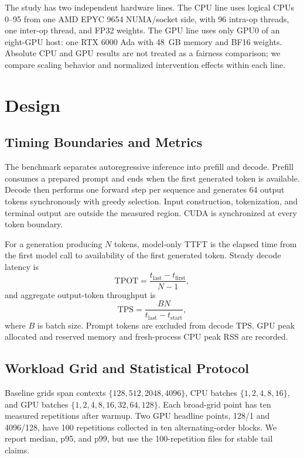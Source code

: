 \documentclass[conference]{IEEEtran}
\newcommand{\tps}{\mathrm{TPS}}
\newcommand{\tpot}{\mathrm{TPOT}}
\begin{document}
The study has two independent hardware lines. The CPU line uses logical CPUs
0--95 from one AMD EPYC 9654 NUMA/socket side, with 96 intra-op threads, one
inter-op thread, and FP32 weights. The GPU line uses only GPU0 of an
eight-GPU host: one RTX 6000 Ada with 48~GB memory and BF16 weights. Absolute
CPU and GPU results are not treated as a fairness comparison; we compare
scaling behavior and normalized intervention effects within each line.

\section{Design}

\subsection{Timing Boundaries and Metrics}

The benchmark separates autoregressive inference into prefill and decode.
Prefill consumes a prepared prompt and ends when the first generated token is
available. Decode then performs one forward step per sequence and generates
64 output tokens synchronously with greedy selection. Input construction,
tokenization, and terminal output are outside the measured region. CUDA is
synchronized at every token boundary.

For a generation producing $N$ tokens, model-only TTFT is the elapsed time
from the first model call to availability of the first generated token.
Steady decode latency is
\begin{equation}
\tpot = \frac{t_{\mathrm{last}}-t_{\mathrm{first}}}{N-1},
\end{equation}
and aggregate output-token throughput is
\begin{equation}
\tps = \frac{B N}{t_{\mathrm{last}}-t_{\mathrm{start}}},
\end{equation}
where $B$ is batch size. Prompt tokens are excluded from decode TPS. GPU peak
allocated and reserved memory and fresh-process CPU peak RSS are recorded.

\subsection{Workload Grid and Statistical Protocol}

Baseline grids span contexts $\{128,512,2048,4096\}$, CPU batches
$\{1,2,4,8,16\}$, and GPU batches
$\{1,2,4,8,16,32,64,128\}$. Each broad-grid point has ten measured
repetitions after warmup. Two GPU headline points, 128/1 and 4096/128, have
100 repetitions collected in ten alternating-order blocks. We report
median, p95, and p99, but use the 100-repetition files for stable tail claims.
\end{document}
